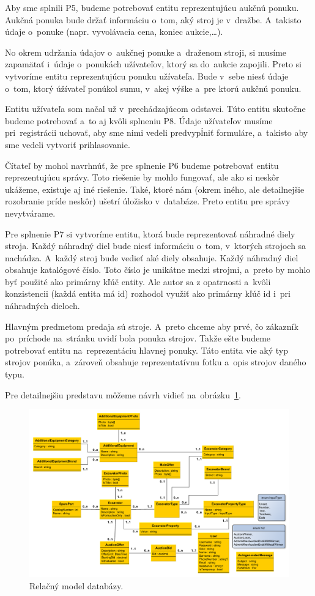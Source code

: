 Aby sme splnili P5, budeme potrebovať entitu reprezentujúcu aukčnú ponuku. Aukčná ponuka bude držať informáciu o~tom, aký stroj je v~dražbe. A~takisto údaje o~ponuke (napr. vyvolávacia cena, koniec aukcie,\dots).

No okrem udržania údajov o~aukčnej ponuke a~draženom stroji, si musíme zapamätať i~údaje o~ponukách užívateľov, ktorý sa do~aukcie zapojili. Preto si vytvoríme entitu reprezentujúcu ponuku užívateľa. Bude v~sebe niesť údaje o~tom, ktorý úžívateľ ponúkol sumu, v~akej výške a~pre ktorú aukčnú ponuku.

Entitu užívateľa som načal už v~prechádzajúcom odstavci. Túto entitu skutočne budeme potrebovať a~to aj kvôli splneniu P8. Údaje užívateľov musíme pri~registrácii uchovať, aby sme nimi vedeli predvypĺniť formuláre, a~takisto aby sme vedeli vytvoriť prihlasovanie.

Čítateľ by mohol navrhnúť, že pre splnenie P6 budeme potrebovať entitu reprezentujúcu správy. Toto riešenie by mohlo fungovať, ale ako si neskôr ukážeme, existuje aj iné riešenie. Také, ktoré nám (okrem iného, ale detailnejšie rozobranie príde neskôr) ušetrí úložisko v~databáze. Preto entitu pre správy nevytvárame.

Pre splnenie P7 si vytvoríme entitu, ktorá bude reprezentovať náhradné diely stroja. Každý náhradný diel bude niesť informáciu o~tom, v~ktorých strojoch sa nachádza. A~každý stroj bude vedieť aké diely obsahuje. Každý náhradný diel obsahuje katalógové číslo. Toto číslo je unikátne medzi strojmi, a~preto by mohlo byť použité ako primárny kľúč entity. Ale autor sa z opatrnosti a~kvôli konzistencii (každá entita má id) rozhodol využiť ako primárny kľúč id i~pri náhradných dieloch.

Hlavným predmetom predaja sú stroje. A~preto chceme aby prvé, čo zákazník po~príchode na~stránku uvidí bola ponuka strojov. Takže ešte budeme potrebovať entitu na~reprezentáciu hlavnej ponuky. Táto entita vie aký typ strojov ponúka, a~zároveň obsahuje reprezentatívnu fotku a~opis strojov daného typu.

Pre detailnejšiu predstavu môžeme návrh vidieť na~obrázku~\ref{relacny model uml}.

\begin{figure}[H]\centering
\includegraphics[width=140mm]{../img/relacny model uml}
\caption{Relačný model databázy.}
\label{relacny model uml}
\end{figure}

